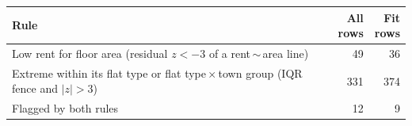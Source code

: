 \begin{tabular}{@{}p{}rr@{}}
\hline
\textbf{Rule} & \shortstack{\textbf{All}\\\textbf{rows}} & \shortstack{\textbf{Fit}\\\textbf{rows}} \\
\hline
Low rent for floor area (residual $z<-3$ of a rent\,$\sim$\,area line) & 49 & 36 \\
Extreme within its flat type or flat type\,$\times$\,town group (IQR fence and $|z|>3$) & 331 & 374 \\
Flagged by both rules & 12 & 9 \\
\hline
\end{tabular}
